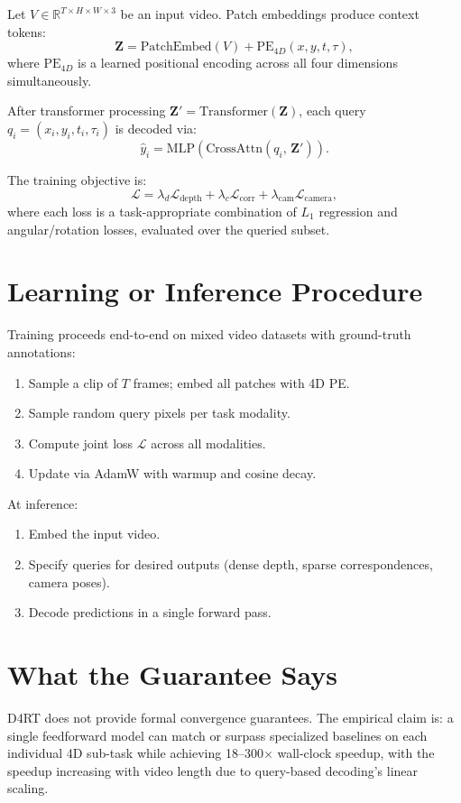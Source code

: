 \documentclass[10pt,twocolumn]{article}
\begin{document}
Let $V \in \mathbb{R}^{T \times H \times W \times 3}$ be an input video.
Patch embeddings produce context tokens:
\[
\mathbf{Z} = \text{PatchEmbed}(V) + \text{PE}_{4D}(x, y, t, \tau),
\]
where $\text{PE}_{4D}$ is a learned positional encoding across all four
dimensions simultaneously.

After transformer processing $\mathbf{Z}' = \text{Transformer}(\mathbf{Z})$,
each query $q_i = (x_i, y_i, t_i, \tau_i)$ is decoded via:
\[
\hat{y}_i = \text{MLP}\!\left(\text{CrossAttn}(q_i,\, \mathbf{Z}')\right).
\]

The training objective is:
\[
\mathcal{L} = \lambda_d \mathcal{L}_{\text{depth}}
            + \lambda_c \mathcal{L}_{\text{corr}}
            + \lambda_{\text{cam}} \mathcal{L}_{\text{camera}},
\]
where each loss is a task-appropriate combination of $L_1$ regression and
angular/rotation losses, evaluated over the queried subset.

\section{Learning or Inference Procedure}

Training proceeds end-to-end on mixed video datasets with ground-truth
annotations:
\begin{enumerate}[itemsep=2pt,parsep=0pt]
  \item Sample a clip of $T$ frames; embed all patches with 4D PE.
  \item Sample random query pixels per task modality.
  \item Compute joint loss $\mathcal{L}$ across all modalities.
  \item Update via AdamW with warmup and cosine decay.
\end{enumerate}

At inference:
\begin{enumerate}[itemsep=2pt,parsep=0pt]
  \item Embed the input video.
  \item Specify queries for desired outputs (dense depth, sparse
    correspondences, camera poses).
  \item Decode predictions in a single forward pass.
\end{enumerate}

\section{What the Guarantee Says}

D4RT does not provide formal convergence guarantees. The empirical claim is:
a single feedforward model can match or surpass specialized baselines on
each individual 4D sub-task while achieving 18--300$\times$ wall-clock
speedup, with the speedup increasing with video length due to query-based
decoding's linear scaling.
\end{document}
